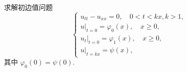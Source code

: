 \begin{exercise}[6]
  求解初边值问题
  \[\begin{cases}
    u_{tt} - u_{xx} = 0,\quad 0<t<kx, k>1, \\
    u|_{t=0} = \varphi_0(x),\quad x\geq 0, \\
    u_t|_{t=0} = \varphi_1(x),\quad x\geq 0, \\
    u|_{t=kx} = \psi(x),
  \end{cases}\]
  其中 $\varphi_0(0) = \psi(0)$.
\end{exercise}



